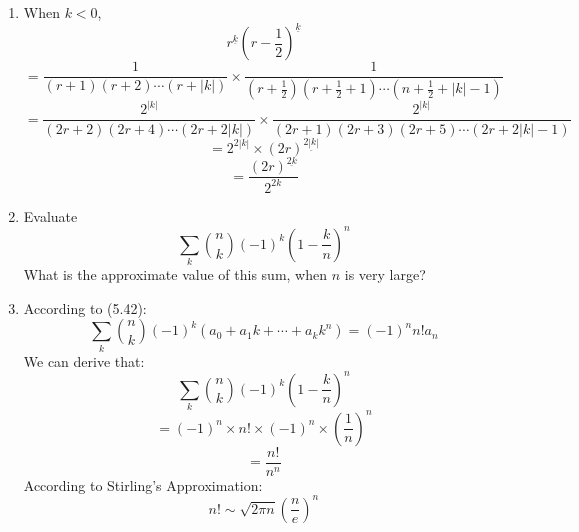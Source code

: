 \documentclass[12pt,a4paper]{article}
\makeatletter
\newtheorem*{solution}{Solution}
\theoremstyle{definition}
\renewenvironment{solution}[1][Solution] {\par\pushQED{\qed}\normalfont\topsep6\p@\@plus6\p@\relax\trivlist\item[\hskip\labelsep\bfseries#1\@addpunct{.}]\ignorespaces}{\popQED\endtrivlist\@endpefalse} \makeatother
\makeatother
\begin{document}
\begin{enumerate}
\begin{solution}
            When $k<0$, 
            \begin{equation*}
                r^{\underline{k}}(r-\frac{1}{2})^{\underline{k}}
            \end{equation*}
            \begin{equation*}
                =\frac{1}{(r+1)(r+2)\cdots(r+|k|)}\times \frac{1}{(r+\frac{1}{2})(r+\frac{1}{2}+1)\cdots(n+\frac{1}{2}+|k|-1)}
            \end{equation*}
            \begin{equation*}
                =\frac{2^{|k|}}{(2r+2)(2r+4)\cdots(2r+2|k|)}\times\frac{2^{|k|}}{(2r+1)(2r+3)(2r+5)\cdots(2r+2|k|-1)}
            \end{equation*}
            \begin{equation*}
                =2^{2|k|}\times (2r)^{\underline{2|k|}}
            \end{equation*}
            \begin{equation*}
                =\frac{(2r)^{\underline{2k}}}{2^{2k}}
            \end{equation*}
        \end{solution}
    \item 
        Evaluate 
        \begin{equation*}
            \sum_{k} \binom{n}{k} (-1)^k(1-\frac{k}{n})^n
        \end{equation*}
        What is the approximate value of this sum, when $n$ is very large?
        \begin{solution}
        	According to (5.42):
        	\begin{equation*}
        	   \sum_{k}\binom{n}{k}(-1)^k(a_0+a_1k+\cdots+a_kk^n)=(-1)^nn!a_n
        	\end{equation*}
        	We can derive that:
        	\begin{equation*}
        	    \sum_{k} \binom{n}{k} (-1)^k(1-\frac{k}{n})^n
        	\end{equation*}
        	\begin{equation*}
        	     =(-1)^n\times n!\times (-1)^n\times (\frac{1}{n})^n
        	\end{equation*}
        	\begin{equation*}
        	    =\frac{n!}{n^n}
        	\end{equation*}
        	According to Stirling's Approximation:
        	\begin{equation*}
        	    n!\sim\sqrt{2\pi n}(\frac{n}{e})^n
        	\end{equation*}

\end{solution}
\end{enumerate}
\end{document}
